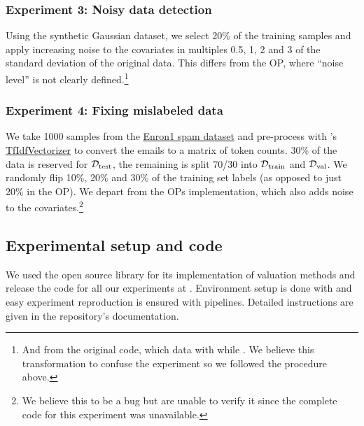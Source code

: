 \subsubsection{Experiment 3: Noisy data detection}\label{sec:dataset-noisy}

Using the synthetic Gaussian dataset, we select 20\% of the training samples
and apply increasing noise to the covariates in multiples 0.5, 1, 2 and 3 of
the standard deviation of the original data. This differs from the OP, where
``noise level'' is not clearly defined.\footnote{And from the original code,
which {} data with {} while {}. We believe this transformation to confuse the
experiment so we followed the procedure above.}

\subsubsection{Experiment 4: Fixing mislabeled data}

We take 1000 samples from the
\href{https://www2.aueb.gr/users/ion/data/enron-spam/index.html}{Enron1 spam
dataset} {\cite{metsis_spam_2006}} and pre-process with
{}'s
\href{https://scikit-learn.org/stable/modules/generated/sklearn.feature\_extraction.text.TfidfVectorizer.html\#sklearn.feature\_extraction.text.TfidfVectorizer}{TfIdfVectorizer}
to convert the emails to a matrix of token counts. 30\% of the data is
reserved for $\mathcal{D}_{\operatorname{test}}$, the remaining is split 70/30 into
$\mathcal{D}_{\operatorname{train}}$ and $\mathcal{D}_{\operatorname{val}}$. We randomly flip
10\%, 20\% and 30\% of the training set labels (as opposed to just 20\% in the
OP). We depart from the OPs implementation, which also adds noise to the
covariates.\footnote{We believe this to be a bug but are unable to verify it
since the complete code for this experiment was unavailable.}

\subsection{Experimental setup and code}

We used the open source library
{}
{\cite{transferlab_pydvl_2022}} for its implementation of valuation methods
and release the code for all our experiments at {\cite{benmerzoug_mlrc22_2022}}. Environment
setup is done with {} and easy experiment reproduction is
ensured with {} {\cite{kuprieiev_dvc_2023}} pipelines. Detailed
instructions are given in the repository's documentation.

